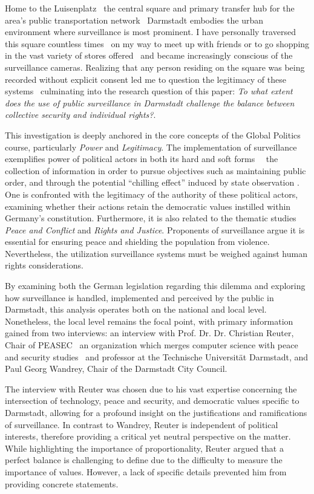 \documentclass[12pt]{article}
\begin{document}
	Home to the Luisenplatz \textemdash\ the central square and primary transfer hub for the area's public transportation network \textemdash\ Darmstadt embodies the urban environment where surveillance is most prominent. I have personally traversed this square countless times \textemdash\ on my way to meet up with friends or to go shopping in the vast variety of stores offered \textemdash\ and became increasingly conscious of the surveillance cameras. Realizing that any person residing on the square was being recorded without explicit consent led me to question the legitimacy of these systems \textemdash\ culminating into the research question of this paper: \textit{To what extent does the use of public surveillance in Darmstadt challenge the balance between collective security and individual rights?}.
	
	This investigation is deeply anchored in the core concepts of the Global Politics course, particularly \textit{Power} and \textit{Legitimacy}. The implementation of surveillance exemplifies power of political actors in both its hard and soft forms \parencite{courseCompanion2024}\ \textemdash\ the collection of information in order to pursue objectives such as maintaining public order, and through the potential ``chilling effect'' induced by state observation \parencite{murray2024}. One is confronted with the legitimacy of the authority of these political actors, examining whether their actions retain the democratic values instilled within Germany's constitution. Furthermore, it is also related to the thematic studies \textit{Peace and Conflict} and \textit{Rights and Justice}. Proponents of surveillance argue it is essential for ensuring peace and shielding the population from violence. Nevertheless, the utilization surveillance systems must be weighed against human rights considerations.
	
	By examining both the German legislation regarding this dilemma and exploring how surveillance is handled, implemented and perceived by the public in Darmstadt, this analysis operates both on the national and local level. Nonetheless, the local level remains the focal point, with primary information gained from two interviews: an interview with Prof. Dr. Dr. Christian Reuter, Chair of PEASEC \textemdash\ an organization which merges computer science with peace and security studies \parencite{noauthor_peasec_2025} \textemdash\ and professor at the Technische Universität Darmstadt, and Paul Georg Wandrey, Chair of the Darmstadt City Council.
	
	The interview with Reuter was chosen due to his vast expertise concerning the intersection of technology, peace and security, and democratic values specific to Darmstadt, allowing for a profound insight on the justifications and ramifications of surveillance. In contrast to Wandrey, Reuter is independent of political interests, therefore providing a critical yet neutral perspective on the matter. While highlighting the importance of proportionality, Reuter argued that a perfect balance is challenging to define due to the difficulty to measure the importance of values. However, a lack of specific details prevented him from providing concrete statements.
	
\end{document}

